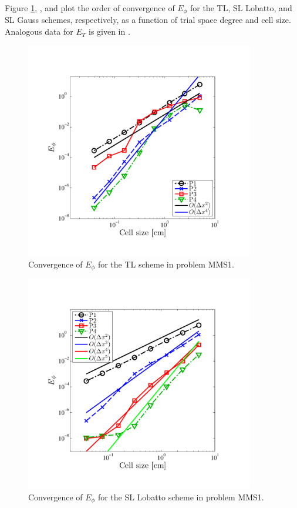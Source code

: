 Figure \ref{fig:mms1_tl_phi}, , and  plot the order of convergence of $E_{\phi}$ for the TL, SL Lobatto, and SL Gauss schemes, respectively, as a function of trial space degree and cell size.
Analogous data for $E_{T}$ is given in .
%
\begin{figure}[!htp]
\centering
\includegraphics[width=10cm,trim=0.25in  0.5in 0.75in 0.75in,clip=true]{chapter6_grey_radtran/Dissertation_Data/MMS2_TL_phi_L2.pdf}
\caption{Convergence of $E_{\phi}$ for the TL scheme in problem MMS1.}
\label{fig:mms1_tl_phi}
\end{figure}
%
%
\begin{figure}[!hbp]
\centering
\includegraphics[width=10cm,trim=0.25in  0.5in 0.75in 0.75in,clip=true]{chapter6_grey_radtran/Dissertation_Data/MMS2_SLXS_Lobatto_phi_L2.pdf}
\caption{Convergence of $E_{\phi}$ for the SL Lobatto scheme in problem MMS1.}
\label{fig:mms1_lobatto_phi}
\end{figure}
